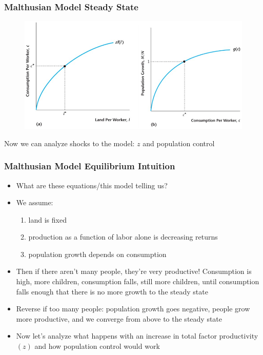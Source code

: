 \documentclass{beamer}
\begin{document}
\begin{frame}
\frametitle[alignment=center]{Malthusian Model Steady State}
\begin{figure}
\centering
\includegraphics[scale=0.5]{Figures/W_Fig_7pt8.png}
\end{figure}
Now we can analyze shocks to the model: $z$ and population control
\end{frame}

\begin{frame}
\frametitle[alignment=center]{Malthusian Model Equilibrium Intuition}
\begin{itemize}
\item What are these equations/this model telling us?
\bigskip
\item We assume:
\smallskip
\begin{enumerate} 
\item land is fixed
\smallskip
\item  production as a function of labor alone is decreasing returns
\smallskip
\item population growth depends on consumption
\end{enumerate}
\smallskip
\item Then if there aren't many people, they're very productive!  Consumption is high, more children, consumption falls, still more children, until consumption falls enough that there is no more growth to the steady state
\bigskip
\item Reverse if too many people:  population growth goes negative, people grow more productive, and we converge from above to the steady state
\bigskip
\item Now let's analyze what happens with an increase in total factor productivity $(z)$ and how population control would work
\end{itemize}
\end{frame}
\end{document}
